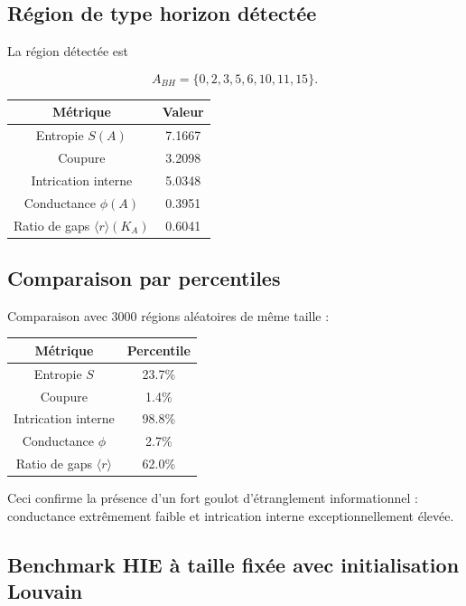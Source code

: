 \documentclass[11pt]{article}
\begin{document}
\subsection{Région de type horizon détectée}

La région détectée est

\[
A_{BH}=\{0,2,3,5,6,10,11,15\}.
\]

\begin{center}
\begin{tabular}{cc}
\toprule
Métrique & Valeur \\
\midrule
Entropie $S(A)$ & 7.1667 \\
Coupure & 3.2098 \\
Intrication interne & 5.0348 \\
Conductance $\phi(A)$ & 0.3951 \\
Ratio de gaps $\langle r\rangle(K_A)$ & 0.6041 \\
\bottomrule
\end{tabular}
\end{center}

\subsection{Comparaison par percentiles}

Comparaison avec 3000 régions aléatoires de même taille :

\begin{center}
\begin{tabular}{cc}
\toprule
Métrique & Percentile \\
\midrule
Entropie $S$ & 23.7\% \\
Coupure & 1.4\% \\
Intrication interne & 98.8\% \\
Conductance $\phi$ & 2.7\% \\
Ratio de gaps $\langle r\rangle$ & 62.0\% \\
\bottomrule
\end{tabular}
\end{center}

Ceci confirme la présence d'un fort goulot d'étranglement informationnel : conductance extrêmement faible et intrication interne exceptionnellement élevée.

\subsection{Benchmark HIE à taille fixée avec initialisation Louvain}
\end{document}
